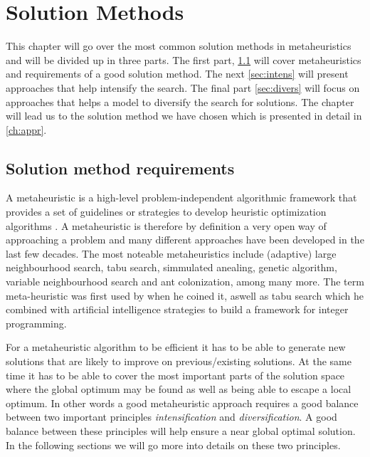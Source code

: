 \documentclass[../main.tex]{subfiles}
\begin{document}
                                                
\chapter{Solution Methods}
\label{ch:methods}

This chapter will go over the most common solution methods in metaheuristics and will be divided up in three parts.
The first part, \cref{sec:requirements} will cover metaheuristics and requirements of a good solution method.
The next \cref{sec:intens} will present approaches that help intensify the search. 
The final part \cref{sec:divers} will focus on approaches that helps a model to diversify the search for solutions. The chapter will lead us to the solution method we have chosen which is presented in detail in \cref{ch:appr}.

\section{Solution method requirements}
\label{sec:requirements}
A metaheuristic is a high-level problem-independent algorithmic framework that provides a set of guidelines or strategies to develop heuristic optimization algorithms \cite{sorensen13}. 
A metaheuristic is therefore by definition a very open way of approaching a problem and many different approaches have been developed in the last few decades.
The most noteable metaheuristics include (adaptive) large neighbourhood search, tabu search, simmulated anealing, genetic algorithm, variable neighbourhood search and ant colonization, among many more. 
The term meta-heuristic was first used by \cite{glover86} when he coined it, aswell as tabu search which he combined with artificial intelligence strategies to build a framework for integer programming. \par

For a metaheuristic algorithm to be efficient it has to be able to generate new solutions that are likely to improve on previous/existing solutions.
At the same time it has to be able to cover the most important parts of the solution space where the global optimum may be found as well as being able to escape a local optimum.
In other words a good metaheuristic approach requires a good balance between two important principles \textit{intensification} and \textit{diversification}. 
A good balance between these principles will help ensure a near global optimal solution.
In the following sections we will go more into details on these two principles.
\end{document}
